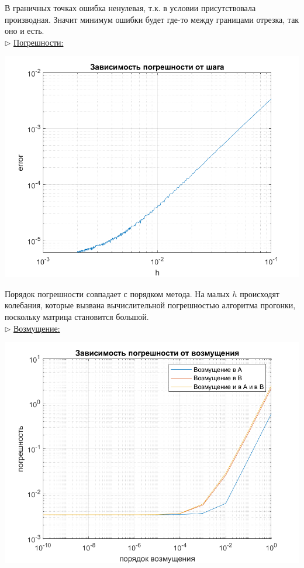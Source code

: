 \documentclass{article}
\begin{document}
	В граничных точках ошибка ненулевая, т.к. в условии присутствовала производная. Значит минимум ошибки будет где-то между границами отрезка, так оно и есть.\\
	$\triangleright$ \underline{Погрешности:}
	\begin{center} \includegraphics[scale = 0.6]{погрешность} \end{center}
	Порядок погрешности совпадает с порядком метода. На малых $h$ происходят колебания, которые вызвана вычислительной погрешностью алгоритма прогонки, поскольку матрица становится большой.\\
	$\triangleright$ \underline{Возмущение:}
	\begin{center} \includegraphics[scale = 0.6]{возмущение} \end{center}
\end{document}
